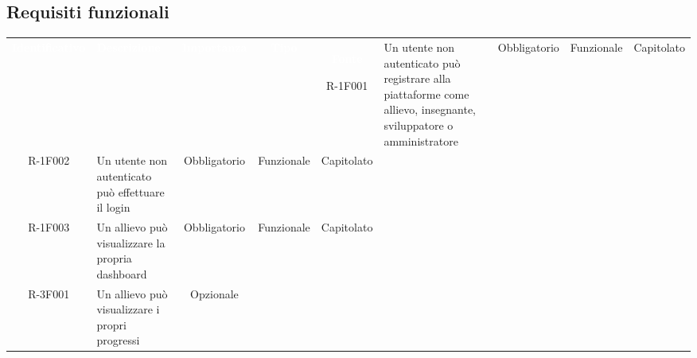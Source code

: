 \subsection{Requisiti funzionali} 
\renewcommand{\arraystretch}{1.5}
\def\tabularxcolumn#1{m{#1}}
\begin{tabularx}{\textwidth}{cXccc}
 
   \textcolor{white}{\textbf{Identificativo}} &
   \textcolor{white}{\textbf{Descrizione}}&
   \textcolor{white}{\textbf{Importanza}}&
   \textcolor{white}{\textbf{Tipo}}&
   \textcolor{white}{\textbf{Fonte}}\endhead
 
R-1F001 &
 
Un utente non autenticato può registrare alla piattaforme come allievo, insegnante, sviluppatore o amministratore &
 
Obbligatorio &
 
Funzionale &
 
Capitolato \\

R-1F002 &

Un utente non autenticato può effettuare il login &

Obbligatorio &

Funzionale &

Capitolato \\
R-1F003 &

Un allievo può visualizzare la propria dashboard &

Obbligatorio &

Funzionale &

Capitolato \\
R-3F001 &


Un allievo può visualizzare i propri progressi &

Opzionale &


\end{tabularx}
